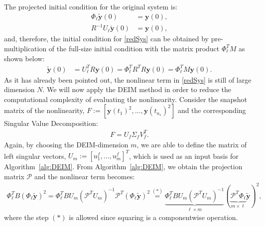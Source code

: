 The projected initial condition for the original system is:
\begin{align*}
\Phi_{\ell} \mathbf{\tilde y}(0) &= \mathbf{y}(0), \\
R^{-1} U_{\ell} \mathbf{\tilde y}(0) &= \mathbf{y}(0),
\end{align*}
and, therefore, the initial condition for \eqref{redSys} can be obtained by pre-multiplication of the full-size initial condition with the matrix product $\Phi_{\ell}^T M$ as shown below:
\begin{align}
\label{initRed}
\mathbf{\tilde y}(0) &= U_{\ell}^T R \mathbf{y}(0) = \Phi_{\ell}^T R^T R \mathbf{y}(0) = \Phi_{\ell}^T M \mathbf{y}(0).
\end{align}
%
As it has already been pointed out, the nonlinear term in \eqref{redSys} is still of large dimension $N$. We will now apply the DEIM method in order to reduce the computational complexity of evaluating the nonlinearity. Consider the snapshot matrix of the nonlinearity, \mbox{$F := [\mathbf{y}(t_1)^2,...,\mathbf{y}(t_{n_s})^2]$} and the corresponding Singular Value Decomposition:
\begin{align*}
 F = U_f \Sigma_f V_f^T.
\end{align*}
Again, by choosing the DEIM-dimension $m$, we are able to define the matrix of left singular vectors, $U_{m} := [u^f_1,...,u^f_{m}]^T$, which is used as an input basis for \mbox{Algorithm \ref{alg:DEIM}}. From \mbox{Algorithm \ref{alg:DEIM}}, we obtain the projection matrix $\mathcal{P}$ and the nonlinear term becomes:
\begin{align*}
 \Phi_{\ell}^T B (\Phi_{\ell} \mathbf{\tilde y})^2 = \Phi_{\ell}^T B U_{m} (\mathcal{P}^T U_{m})^{-1} \mathcal{P}^T (\Phi_{\ell} \mathbf{\tilde y})^2 \stackrel{(*)}{=} \underbrace{\Phi_{\ell}^T B U_{m} (\mathcal{P}^T U_{m})^{-1}}_{\ell \times m}(\underbrace{\mathcal{P}^T \Phi_{\ell}}_{m \times \ell} \mathbf{\tilde y})^2,
\end{align*}
where the step $(*)$ is allowed since squaring is a componentwise operation.
\newpage
